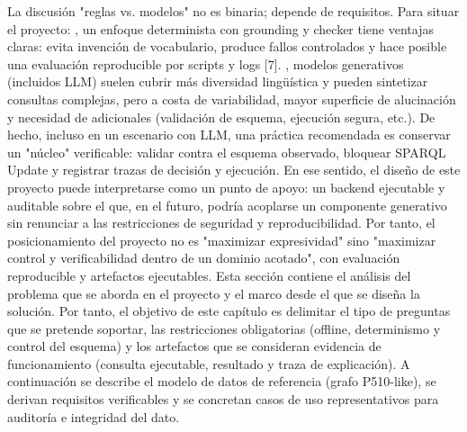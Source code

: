 {}\markdownRendererInterblockSeparator
{}La discusión "reglas vs. modelos" no es binaria; depende de requisitos. Para situar el proyecto:\markdownRendererInterblockSeparator
{}\markdownRendererUlBeginTight
\markdownRendererUlItem {}, un enfoque determinista con grounding y checker tiene ventajas claras: evita invención de vocabulario, produce fallos controlados y hace posible una evaluación reproducible por scripts y logs [7].\markdownRendererUlItemEnd 
\markdownRendererUlItem {}, modelos generativos (incluidos LLM) suelen cubrir más diversidad lingüística y pueden sintetizar consultas complejas, pero a costa de variabilidad, mayor superficie de alucinación y necesidad de  adicionales (validación de esquema, ejecución segura, etc.).\markdownRendererUlItemEnd 
\markdownRendererUlEndTight \markdownRendererInterblockSeparator
{}De hecho, incluso en un escenario con LLM, una práctica recomendada es conservar un "núcleo" verificable: validar contra el esquema observado, bloquear SPARQL Update y registrar trazas de decisión y ejecución. En ese sentido, el diseño de este proyecto puede interpretarse como un punto de apoyo: un backend ejecutable y auditable sobre el que, en el futuro, podría acoplarse un componente generativo sin renunciar a las restricciones de seguridad y reproducibilidad.\markdownRendererInterblockSeparator
{}Por tanto, el posicionamiento del proyecto no es "maximizar expresividad" sino "maximizar control y verificabilidad dentro de un dominio acotado", con evaluación reproducible y artefactos ejecutables.\markdownRendererInterblockSeparator
{}\markdownRendererHorizontalRule{}\markdownRendererInterblockSeparator
{}\markdownRendererInterblockSeparator
{}Esta sección contiene el análisis del problema que se aborda en el proyecto y el marco desde el que se diseña la solución. Por tanto, el objetivo de este capítulo es delimitar el tipo de preguntas que se pretende soportar, las restricciones obligatorias (offline, determinismo y control del esquema) y los artefactos que se consideran evidencia de funcionamiento (consulta ejecutable, resultado y traza de explicación).\markdownRendererInterblockSeparator
{}A continuación se describe el modelo de datos de referencia (grafo P510-like), se derivan requisitos verificables y se concretan casos de uso representativos para auditoría e integridad del dato.\markdownRendererInterblockSeparator
